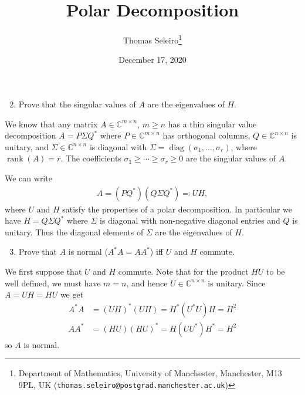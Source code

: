 \documentclass[10pt, A4paper]{article}
\newcommand{\mxn}{m \times n}
\newcommand{\nxn}{n \times n}
\DeclareMathOperator{\diag}{diag}
\DeclareMathOperator{\rank}{rank}
\begin{document}
\title{Polar Decomposition}
\author{Thomas Seleiro\thanks
	{Department of Mathematics, University of Manchester, 
	Manchester, M13 9PL, UK
	(\texttt{thomas.seleiro@postgrad.manchester.ac.uk})}}
\date{December 17, 2020}
\maketitle


\begin{enumerate}
	\setcounter{enumi}{1}
	\item Prove that the singular values of $A$ are the eigenvalues of $H$.
\end{enumerate}

We know that any matrix $A\in\mathbb{C}^{\mxn}$, $m\geq n$ has 
a thin singular value decomposition $A = P \Sigma Q^*$ where $P \in
\mathbb{C}^{\mxn}$ has orthogonal columns, $Q \in 
\mathbb{C}^{\nxn}$ is unitary, and $\Sigma \in 
\mathbb{C}^{\nxn}$ is diagonal with $\Sigma = \diag(\sigma_1, 
\ldots, \sigma_r)$, where $\rank(A) = r$. The coefficients $\sigma_1 
\geq \cdots \geq \sigma_r \geq 0$ are the singular values of $A$.

We can write
\begin{align}
	A = (PQ^*) (Q \Sigma Q^*) \eqqcolon UH,
	\label{eq:PolarSVD}
\end{align}
where $U$ and $H$ satisfy the properties of a polar decomposition.
In particular we have $H = Q \Sigma Q^*$ where $\Sigma$ is diagonal 
with non-negative diagonal entries and $Q$ is unitary.
Thus the diagonal elements of $\Sigma$ are the eigenvalues of $H$.





\vspace{0.2cm}
\begin{enumerate}
	\setcounter{enumi}{2}
	\item Prove that $A$ is normal ($A^*A = AA^*$) iff $U$ and $H$
	commute.
\end{enumerate}

We first suppose that $U$ and $H$ commute. Note that for the product
$HU$ to be well defined, we must have $m = n$, and hence
$U\in\mathbb{C}^{\nxn}$ is unitary. Since $A = UH = HU$ we get
\begin{align}
	\label{eq:AstarA}
	A^*A &= (UH)^* (UH) = H^*(U^*U)H = H^2 \\
	AA^* &= (HU) (HU)^* = H(UU^*)H^* = H^2 \nonumber
\end{align}
so $A$ is normal.
\end{document}
